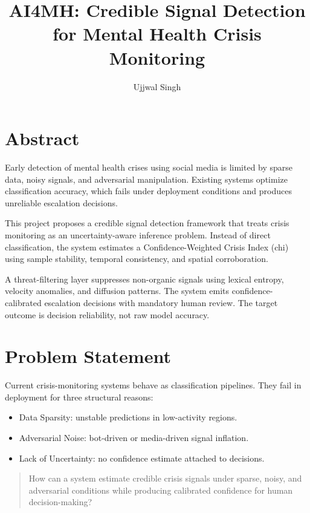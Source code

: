 \documentclass[11pt]{article}
\title{AI4MH: Credible Signal Detection for Mental Health Crisis Monitoring}
\author{Ujjwal Singh}
\date{}
\begin{document}
\maketitle

\section{Abstract}

Early detection of mental health crises using social media is limited by sparse data, noisy signals, and adversarial manipulation. Existing systems optimize classification accuracy, which fails under deployment conditions and produces unreliable escalation decisions.

This project proposes a credible signal detection framework that treats crisis monitoring as an uncertainty-aware inference problem. Instead of direct classification, the system estimates a Confidence-Weighted Crisis Index (chi) using sample stability, temporal consistency, and spatial corroboration.

A threat-filtering layer suppresses non-organic signals using lexical entropy, velocity anomalies, and diffusion patterns. The system emits confidence-calibrated escalation decisions with mandatory human review. The target outcome is decision reliability, not raw model accuracy.

\section{Problem Statement}

Current crisis-monitoring systems behave as classification pipelines. They fail in deployment for three structural reasons:

\begin{itemize}[leftmargin=*]
\item Data Sparsity: unstable predictions in low-activity regions.
\item Adversarial Noise: bot-driven or media-driven signal inflation.
\item Lack of Uncertainty: no confidence estimate attached to decisions.
\end{itemize}

\begin{quote}
How can a system estimate credible crisis signals under sparse, noisy, and adversarial conditions while producing calibrated confidence for human decision-making?
\end{quote}
\end{document}
